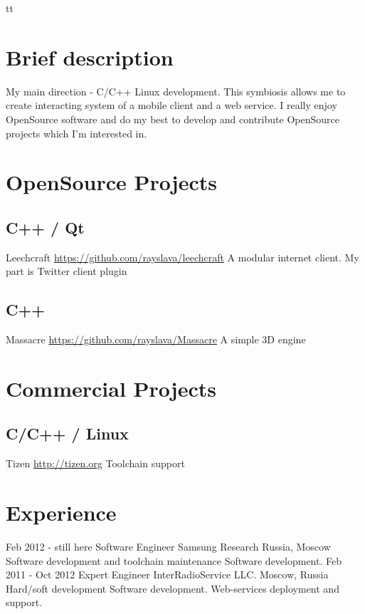 tt\documentclass[11pt,a4paper]{moderncv}
\begin{document}
\maketitle

\section{Brief description}
\cvitem
  {}
  {My main direction - C/C++ Linux development.\newline{}
  This symbiosis allows me to create interacting system of a mobile client and a web service.\newline{}
  I really enjoy OpenSource software and do my best to develop and contribute OpenSource projects which I'm interested in.}

\section{OpenSource Projects}
\subsection{C++ / Qt}
\cvitem
  {Leechcraft}
  {\url{https://github.com/rayslava/leechcraft}\newline{}
  A modular internet client. My part is Twitter client plugin}
\subsection{C++}
\cvitem
  {Massacre}
  {\url{https://github.com/rayslava/Massacre}\newline{}
  A simple 3D engine}

\section{Commercial Projects}
  \subsection{C/C++ / Linux}
  \cvitem
    {Tizen}
    {\url{http://tizen.org}\newline{}
    Toolchain support}

\section{Experience}
\cventry
  {Feb 2012 - still here}
  {Software Engineer}
  {Samsung Research Russia, Moscow}
  {}{}
  {Software development and toolchain maintenance
  \newline{}Software development.}
\cventry
  {Feb 2011 - Oct 2012}
  {Expert Engineer}
  {InterRadioService LLC. Moscow, Russia}
  {}{}
  {Hard/soft development
  \newline{}Software development.
  \newline{}Web-services deployment and support.}
\end{document}

